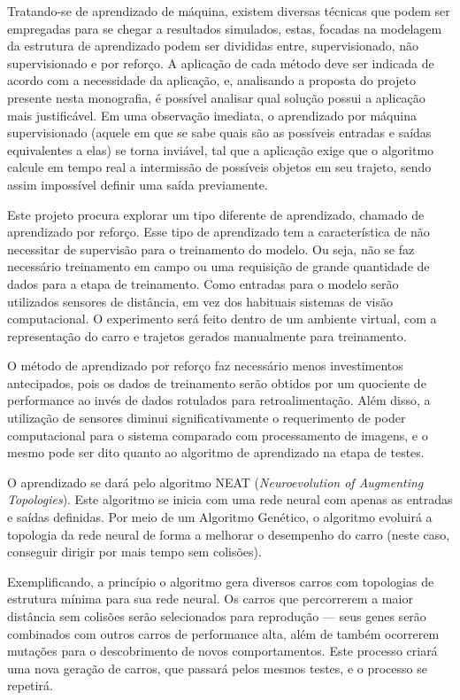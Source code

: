 Tratando-se de aprendizado de máquina, existem diversas técnicas que
podem ser empregadas para se chegar a resultados simulados, estas, focadas
na modelagem da estrutura de aprendizado podem ser divididas entre,
supervisionado, não supervisionado e por reforço. A aplicação de cada método
deve ser indicada de acordo com a necessidade da aplicação, e, analisando a
proposta do projeto presente nesta monografia, é possível analisar qual solução
possui a aplicação mais justificável. Em uma observação imediata, o
aprendizado por máquina supervisionado (aquele em que se sabe quais são as
possíveis entradas e saídas equivalentes a elas) se torna inviável, tal que a
aplicação exige que o algoritmo calcule em tempo real a intermissão de possíveis
objetos em seu trajeto, sendo assim impossível definir uma saída previamente.

Este projeto procura explorar um tipo diferente de aprendizado, chamado
de aprendizado por reforço. Esse tipo de aprendizado tem a característica de
não necessitar de supervisão para o treinamento do modelo. Ou seja, não se faz
necessário treinamento em campo ou uma requisição de grande quantidade de
dados para a etapa de treinamento. Como entradas para o modelo serão
utilizados sensores de distância, em vez dos habituais sistemas de visão
computacional. O experimento será feito dentro de um ambiente virtual, com a
representação do carro e trajetos gerados manualmente para treinamento.

O método de aprendizado por reforço faz necessário menos investimentos
antecipados, pois os dados de treinamento serão obtidos por um quociente de
performance ao invés de dados rotulados para retroalimentação. Além disso, a
utilização de sensores diminui significativamente o requerimento de poder
computacional para o sistema comparado com processamento de imagens, e o
mesmo pode ser dito quanto ao algoritmo de aprendizado na etapa de testes.

O aprendizado se dará pelo algoritmo NEAT (\textit{Neuroevolution of
Augmenting Topologies}). Este algoritmo se inicia com uma rede neural com
apenas as entradas e saídas definidas. Por meio de um Algoritmo Genético, o
algoritmo evoluirá a topologia da rede neural de forma a melhorar o desempenho
do carro (neste caso, conseguir dirigir por mais tempo sem colisões).

Exemplificando, a princípio o algoritmo gera diversos carros com topologias
de estrutura mínima para sua rede neural. Os carros que percorrerem a maior 
distância sem colisões serão selecionados para reprodução — seus genes serão 
combinados com outros carros de performance alta, além de também ocorrerem mutações
para o descobrimento de novos comportamentos. Este processo criará uma nova
geração de carros, que passará pelos mesmos testes, e o processo se repetirá.


